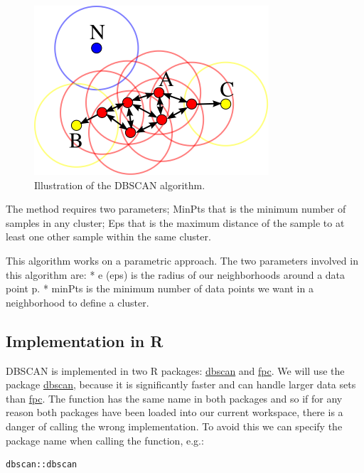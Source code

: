 \documentclass[]{book}
\theoremstyle{definition}
\theoremstyle{definition}
\theoremstyle{definition}
\theoremstyle{remark}
\begin{document}
\begin{figure}

{\centering \includegraphics[width=0.75\linewidth]{images/DBSCAN_Illustration} 

}

\caption{Illustration of the DBSCAN algorithm.}\label{fig:dbscanIllustration}
\end{figure}

The method requires two parameters; MinPts that is the minimum number of
samples in any cluster; Eps that is the maximum distance of the sample
to at least one other sample within the same cluster.

This algorithm works on a parametric approach. The two parameters
involved in this algorithm are: * e (eps) is the radius of our
neighborhoods around a data point p. * minPts is the minimum number of
data points we want in a neighborhood to define a cluster.

\subsection{Implementation in R}\label{implementation-in-r}

DBSCAN is implemented in two R packages:
\href{https://cran.r-project.org/package=dbscan}{dbscan} and
\href{https://cran.r-project.org/package=fpc}{fpc}. We will use the
package \href{https://cran.r-project.org/package=dbscan}{dbscan},
because it is significantly faster and can handle larger data sets than
\href{https://cran.r-project.org/package=fpc}{fpc}. The function has the
same name in both packages and so if for any reason both packages have
been loaded into our current workspace, there is a danger of calling the
wrong implementation. To avoid this we can specify the package name when
calling the function, e.g.:

\begin{verbatim}
dbscan::dbscan
\end{verbatim}
\end{document}
